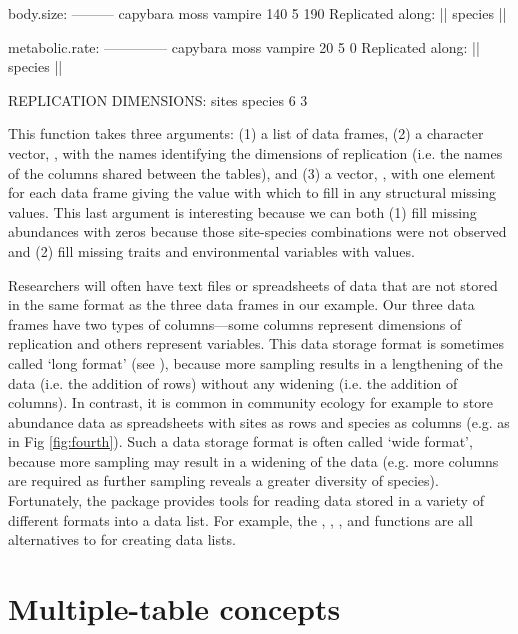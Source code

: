 \documentclass[a4paper]{report}
\numberwithin{exercise}{section}
\begin{document}
\begin{article}
\begin{Schunk}
\begin{Soutput}
body.size:
---------
capybara     moss  vampire 
     140        5      190 
Replicated along:  || species || 


metabolic.rate:
--------------
capybara     moss  vampire 
      20        5        0 
Replicated along:  || species || 


REPLICATION DIMENSIONS: 
  sites species 
      6       3 
\end{Soutput}
\end{Schunk}
This function takes three arguments:  (1) a list of data frames, (2) a character vector, , with the names identifying the dimensions of replication (i.e. the names of the columns shared between the tables), and (3) a vector, , with one element for each data frame giving the value with which to fill in any structural missing values.  This last argument is interesting because we can both (1) fill missing abundances with zeros because those site-species combinations were not observed and (2) fill missing traits and environmental variables with  values.

Researchers will often have text files or spreadsheets of data that are not stored in the same format as the three data frames in our example.  Our three data frames have two types of columns---some columns represent dimensions of replication and others represent variables.  This data storage format is sometimes called `long format' (see ), because more sampling results in a lengthening of the data (i.e. the addition of rows) without any widening (i.e. the addition of columns).  In contrast, it is common in community ecology for example to store abundance data as spreadsheets with sites as rows and species as columns (e.g. as in Fig \ref{fig:fourth}).  Such a data storage format is often called `wide format', because more sampling may result in a widening of the data (e.g. more columns are required as further sampling reveals a greater diversity of species).  Fortunately, the  package provides tools for reading data stored in a variety of different formats into a data list.  For example, the , , , and  functions are all alternatives to  for creating data lists.

\section{Multiple-table concepts}


\end{article}
\end{document}
